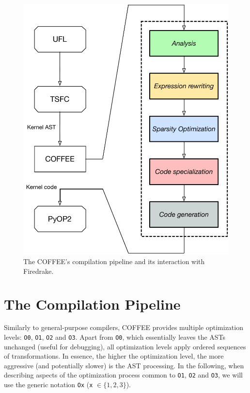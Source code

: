 \begin{figure}
\centering
\includegraphics[scale=0.50]{coffee/pictures/coffee-pipeline.pdf}
\caption{The COFFEE's compilation pipeline and its interaction with Firedrake.}
\label{fig:coffee-pipeline}
\end{figure}

\section{The Compilation Pipeline}
\label{sec:coffee:pipeline}
Similarly to general-purpose compilers, COFFEE provides multiple optimization levels: \texttt{O0}, \texttt{O1}, \texttt{O2} and \texttt{O3}. Apart from \texttt{O0}, which essentially leaves the ASTs unchanged (useful for debugging), all optimization levels apply ordered sequences of transformations. In essence, the higher the optimization level, the more aggressive (and potentially slower) is the AST processing. In the following, when describing aspects of the optimization process common to \texttt{O1}, \texttt{O2} and \texttt{O3}, we will use the generic notation \texttt{Ox} (\texttt{x} $\in \lbrace 1, 2, 3\rbrace$).

